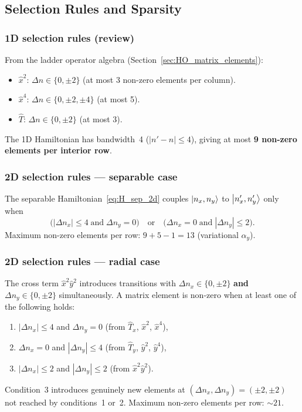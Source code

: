 \subsection{Selection Rules and Sparsity}\label{sec:selection_rules}

\subsubsection{1D selection rules (review)}

From the ladder operator algebra (Section~\ref{sec:HO_matrix_elements}):
\begin{itemize}
    \item $\hat{x}^2$: $\Delta n \in \{0, \pm 2\}$ \quad
          (at most 3 non-zero elements per column).
    \item $\hat{x}^4$: $\Delta n \in \{0, \pm 2, \pm 4\}$ \quad
          (at most 5).
    \item $\hat{T}$: $\Delta n \in \{0, \pm 2\}$ \quad (at most 3).
\end{itemize}
The 1D Hamiltonian has bandwidth~4 ($|n'-n|\leq 4$), giving at most
\textbf{9 non-zero elements per interior row}.

\subsubsection{2D selection rules --- separable case}

The separable Hamiltonian~\eqref{eq:H_sep_2d} couples $\ket{n_x, n_y}$ to
$\ket{n'_x, n'_y}$ only when
\begin{equation}\label{eq:sel_sep_2d}
    \bigl(|\Delta n_x| \leq 4 \;\text{and}\; \Delta n_y = 0\bigr)
    \quad\text{or}\quad
    \bigl(\Delta n_x = 0 \;\text{and}\; |\Delta n_y| \leq 2\bigr).
\end{equation}
Maximum non-zero elements per row: $9 + 5 - 1 = 13$ (variational $\alpha_y$).

\subsubsection{2D selection rules --- radial case}

The cross term $\hat{x}^2\hat{y}^2$ introduces transitions with
$\Delta n_x \in \{0,\pm 2\}$ \textbf{and} $\Delta n_y \in \{0,\pm 2\}$
simultaneously.  A matrix element is non-zero when at least one of the
following holds:
\begin{enumerate}
    \item $|\Delta n_x| \leq 4$ and $\Delta n_y = 0$
          (from $\hat{T}_x$, $\hat{x}^2$, $\hat{x}^4$),
    \item $\Delta n_x = 0$ and $|\Delta n_y| \leq 4$
          (from $\hat{T}_y$, $\hat{y}^2$, $\hat{y}^4$),
    \item $|\Delta n_x| \leq 2$ and $|\Delta n_y| \leq 2$
          (from $\hat{x}^2\hat{y}^2$).
\end{enumerate}
Condition~3 introduces genuinely new elements at
$(\Delta n_x, \Delta n_y) = (\pm 2, \pm 2)$ not reached by conditions~1
or~2.  Maximum non-zero elements per row: $\sim 21$.

